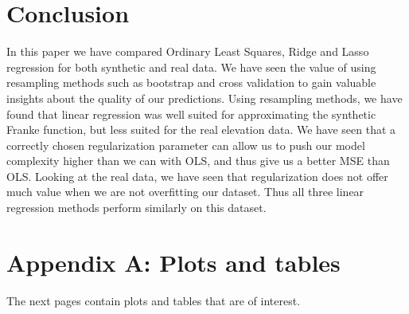 \documentclass[onecolumn,10pt,cleanfoot]{asme2ej}
\begin{document}
\section{Conclusion}

In this paper we have compared Ordinary Least Squares, Ridge and Lasso regression for both synthetic and real data. We have seen the value of using resampling methods such as bootstrap and cross validation to gain valuable insights about the quality of our predictions. Using resampling methods, we have found that linear regression was well suited for approximating the synthetic Franke function, but less suited for the real elevation data. We have seen that a correctly chosen regularization parameter can allow us to push our model complexity higher than we can with OLS, and thus give us a better MSE than OLS. Looking at the real data, we have seen that regularization does not offer much value when we are not overfitting our dataset. Thus all three linear regression methods perform similarly on this dataset. 




\section*{Appendix A: Plots and tables}

The next pages contain plots and tables that are of interest.
\end{document}
